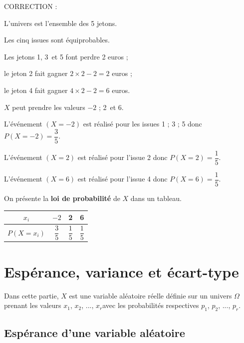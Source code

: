 \documentclass[11pt]{cornouaille}
\begin{document}
{\color{red}

CORRECTION :


  L'univers est l'ensemble des 5 jetons. 

  Les cinq issues sont \'{e}quiprobables.

  Les jetons 1, 3~et 5 font perdre 2 euros ; 

  le jeton 2 fait gagner $2 \times 2 - 2 = 2$ euros ;

  le jeton 4 fait gagner $4 \times 2 - 2 = 6$ euros.  

  $X$ peut prendre les valeurs $ - 2$ ; 2~et 6.

  L'\'{e}v\'{e}nement $\left( {X = - 2} \right)$ est r\'{e}alis\'{e}
  pour les issues 1 ; 3 ; 5 donc $P\left( {X = - 2} \right) =
  \dfrac{3}{5}$.

  L'\'{e}v\'{e}nement $\left( {X = 2} \right)$ est r\'{e}alis\'{e}
  pour l'issue 2 donc $P\left( {X = 2} \right) = \dfrac{1}{5}$.

  L'\'{e}v\'{e}nement $\left( {X = 6} \right)$ est r\'{e}alis\'{e}
  pour l'issue 4 donc $P\left( {X = 6} \right) = \dfrac{1}{5}$.

  On pr\'{e}sente la \textbf{loi de probabilit\'{e}} de $X$ dans un
  tableau.

  \begin{center}
    \begin{tabular}{|*4{c|}}
      \hline
      \cellcolor{FondTableaux}
      ${x_i}$                       & $ - 2$        & 2             & 6             \\      \hline
     \cellcolor{FondTableaux}
      $P\left( {X = {x_i}} \right)$ & $\dfrac{3}{5}$ & $\dfrac{1}{5}$ & $\dfrac{1}{5}$ \\      \hline
    \end{tabular}
  \end{center}
}



\section{Espérance, variance et écart-type}

Dans cette partie, $X$ est une variable aléatoire réelle définie sur un univers $\Omega$ prenant les valeurs $x_1$​, $x_2$​, ..., $x_r$​ avec les probabilités respectives $p_1$​, $p_2$​, ..., $p_r$​.

\bigskip

\subsection{Espérance d'une variable aléatoire}
\end{document}
